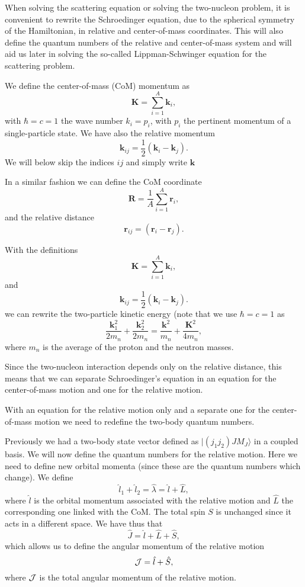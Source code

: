 \documentclass[graybox,sectrefs,envcountresetchap,open=right]{svmonodo}
\begin{document}
When solving the scattering equation or solving the two-nucleon problem, it is convenient to rewrite the Schroedinger equation, due to
the spherical symmetry of the Hamiltonian, in relative and center-of-mass coordinates. This will also define the quantum numbers of the relative and center-of-mass system and will aid us later in solving
the so-called Lippman-Schwinger equation for the scattering problem. 

We define the center-of-mass (CoM)  momentum as
 \[
    \mathbf{K}=\sum_{i=1}^A\mathbf{k}_i,
 \]
with $\hbar=c=1$ the wave number $k_i=p_i$, with $p_i$ the pertinent momentum of a single-particle state. 
We have also the relative momentum
\[
    \mathbf{k}_{ij}=\frac{1}{2}(\mathbf{k}_i-\mathbf{k}_j).
 \]
We will below skip the indices $ij$ and simply write $\mathbf{k}$




In a similar fashion we can define the CoM coordinate
 \[
     \mathbf{R}=\frac{1}{A}\sum_{i=1}^{A}\mathbf{r}_i,
 \]
 and the relative distance 
\[
    \mathbf{r}_{ij}=(\mathbf{r}_i-\mathbf{r}_j).
 \]


With the definitions
 \[
    \mathbf{K}=\sum_{i=1}^A\mathbf{k}_i,
 \]
and
\[
    \mathbf{k}_{ij}=\frac{1}{2}(\mathbf{k}_i-\mathbf{k}_j).
 \]
we can rewrite the two-particle kinetic energy (note that we use $\hbar=c=1$ as 
\[
\frac{\mathbf{k}_1^2}{2m_n}+\frac{\mathbf{k}_2^2}{2m_n}=\frac{\mathbf{k}^2}{m_n}+\frac{\mathbf{K}^2}{4m_n},
\]
where $m_n$ is the average of the proton and the neutron masses. 



Since the two-nucleon interaction depends only on the relative distance, this means that we can separate Schroedinger's equation in an equation for the center-of-mass motion and one for the relative motion.

With an equation for the relative motion only and a separate one for the center-of-mass motion we need to redefine the two-body quantum numbers.

Previously we had a two-body state vector defined as $|(j_1j_2)JM_J\rangle$ in a coupled basis. 
We will now define the quantum numbers for the relative motion. Here we need to define new orbital momenta (since these are the quantum numbers which change). 
We define 
\[
\hat{l}_1+\hat{l}_2=\hat{\lambda}=\hat{l}+\hat{L},
\]
where $\hat{l}$ is the orbital momentum associated with the relative motion and
$\hat{L}$ the corresponding one linked with the CoM. The total spin $S$ is unchanged since it acts in a different space. We have thus that
\[
\hat{J}=\hat{l}+\hat{L}+\hat{S},
\]
which allows us to define the angular momentum of the relative motion
\[
{ \cal J} =  \hat{l}+\hat{S},
\]
where ${ \cal J}$ is the total angular momentum of the relative motion.
\end{document}
